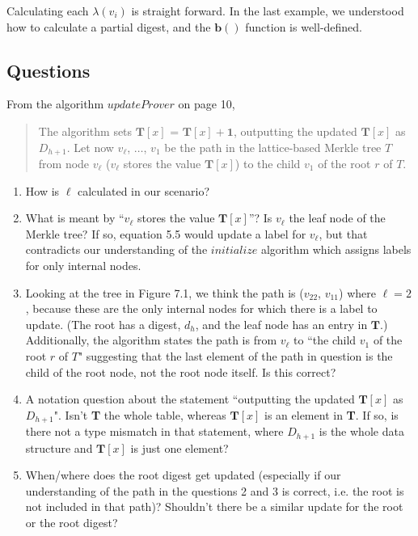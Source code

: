 \documentclass[11pt, letterpaper, oneside]{article}
\begin{document}
Calculating each $\lambda(v_{i})$ is straight forward.  In the last example, we understood how to calculate a partial digest, and the $\textbf{b}()$ function is well-defined.

\subsection{Questions}

From the algorithm $updateProver$ on page 10,

\begin{quote}
The algorithm sets $\textbf{T}[x]$ = $\textbf{T}[x] + \textbf{1}$, outputting the updated $\textbf{T}[x]$ as $D_{h + 1}$. Let now
$v_{\ell}$, $\ldots$, $v_{1}$ be the path in the lattice-based Merkle tree $T$ from node $v_{\ell}$ ($v_{\ell}$ stores the value  $\textbf{T}[x]$) to the child $v_{1}$ of the root $r$ of $T$.
\end{quote}


\begin{enumerate}
\item How is  $\ell$ calculated in our scenario?

\item What is meant by ``$v_{\ell}$ stores the value $\textbf{T}[x]$''? Is $v_{\ell}$ the leaf node of the Merkle tree?  If so, equation 5.5 would update a label for $v_{\ell}$, but that contradicts our understanding of the $initialize$ algorithm which assigns labels for only internal nodes.


\item Looking at the tree in Figure 7.1, we think the path is ($v_{22}$, $v_{11}$) where $\ell = 2$, because these are the only internal nodes for which there is a label to update.  (The root has a digest, $d_{h}$, and the leaf node has an entry in $\textbf{T}$.)  Additionally, the algorithm states the path is from $v_{\ell}$ to ``the child $v_{1}$ of the root $r$ of $T$" suggesting that the last element of the path in question is the child of the root node, not the root node itself. Is this correct?

\item A notation question about the statement ``outputting the updated $\textbf{T}[x]$ as $D_{h + 1}$".  Isn't \textbf{T} the whole table, whereas $\textbf{T}[x]$ is an element in \textbf{T}.  If so, is there not a type mismatch in that statement, where $D_{h + 1}$ is the whole data structure and $\textbf{T}[x]$ is just one element?

\item When/where does the root digest get updated (especially if our understanding of the path in the questions 2 and 3 is correct, i.e. the root is not included in that path)?  Shouldn't there be a similar update for the root or the root digest?

\end{enumerate}
\end{document}
